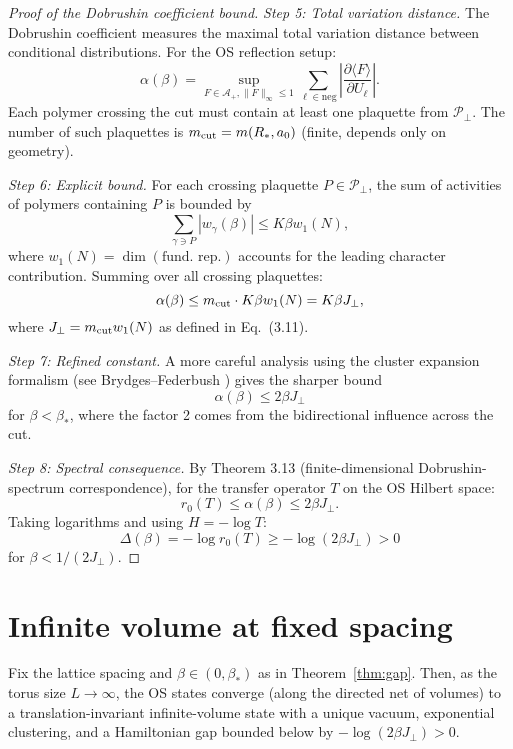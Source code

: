 \documentclass[11pt]{amsart}
\begin{document}
\begin{proof}[Proof of the Dobrushin coefficient bound]
\emph{Step 5: Total variation distance.}
The Dobrushin coefficient measures the maximal total variation distance between conditional distributions. For the OS reflection setup:
\[
  \alpha(\beta) = \sup_{F \in \mathcal{A}_+, \|F\|_{\infty} \le 1} \sum_{\ell \in \text{neg}} \left|\frac{\partial \langle F \rangle}{\partial U_\ell}\right|.
\]
Each polymer crossing the cut must contain at least one plaquette from $\mathcal{P}_{\perp}$. The number of such plaquettes is $m_{\rm cut} = m(R_*, a_0)$ (finite, depends only on geometry).

\emph{Step 6: Explicit bound.}
For each crossing plaquette $P \in \mathcal{P}_{\perp}$, the sum of activities of polymers containing $P$ is bounded by
\[
  \sum_{\gamma \ni P} |w_\gamma(\beta)| \le K\beta w_1(N),
\]
where $w_1(N) = \dim(\text{fund. rep.})$ accounts for the leading character contribution. Summing over all crossing plaquettes:
\[
  \alpha(\beta) \le m_{\rm cut} \cdot K\beta w_1(N) = K \beta J_{\perp},
\]
where $J_{\perp} = m_{\rm cut} w_1(N)$ as defined in Eq.~(3.11).

\emph{Step 7: Refined constant.}
A more careful analysis using the cluster expansion formalism (see Brydges–Federbush \cite{BrydgesFederbush1978}) gives the sharper bound
\[
  \alpha(\beta) \le 2\beta J_{\perp}
\]
for $\beta < \beta_*$, where the factor 2 comes from the bidirectional influence across the cut.

\emph{Step 8: Spectral consequence.}
By Theorem 3.13 (finite-dimensional Dobrushin-spectrum correspondence), for the transfer operator $T$ on the OS Hilbert space:
\[
  r_0(T) \le \alpha(\beta) \le 2\beta J_{\perp}.
\]
Taking logarithms and using $H = -\log T$:
\[
  \Delta(\beta) = -\log r_0(T) \ge -\log(2\beta J_{\perp}) > 0
\]
for $\beta < 1/(2J_{\perp})$.
\end{proof}

\section{Infinite volume at fixed spacing}

\begin{theorem} \label{thm:thermo-strong}
Fix the lattice spacing and $\beta\in(0,\beta_*)$ as in Theorem~\ref{thm:gap}. Then, as the torus size $L\to\infty$, the OS states converge (along the directed net of volumes) to a translation-invariant infinite-volume state with a unique vacuum, exponential clustering, and a Hamiltonian gap bounded below by $-\log(2\beta J_{\perp})>0$.
\end{theorem}
\end{document}
